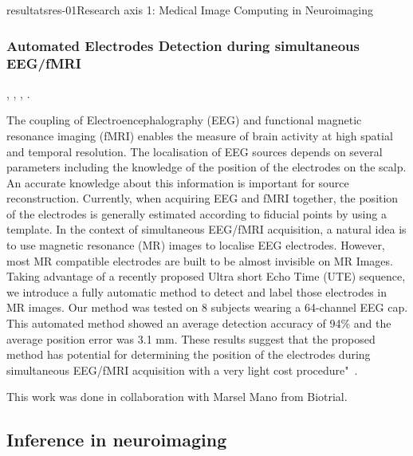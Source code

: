 \documentclass{ra2018}
\begin{document}
\begin{module}{resultats}{res-01}{Research axis 1: Medical Image Computing in Neuroimaging}
\subsubsection{Automated Electrodes Detection during simultaneous EEG/fMRI}
\begin{participants}
      ,
      ,
      ,
      .     
\end{participants}
The coupling of Electroencephalography (EEG) and functional magnetic resonance imaging (fMRI) enables the measure of brain activity at high spatial and temporal resolution. The localisation of EEG sources depends on several parameters including the knowledge of the position of the electrodes on the scalp. An accurate knowledge about this information is important for source reconstruction. Currently, when acquiring EEG and fMRI together, the position of the electrodes is generally estimated according to fiducial points by using a template. In the context of simultaneous EEG/fMRI acquisition, a natural idea is to use magnetic resonance (MR) images to localise EEG electrodes. However, most MR compatible electrodes are built to be almost invisible on MR Images. Taking advantage of a recently proposed Ultra short Echo Time (UTE) sequence, we introduce a fully automatic method to detect and label those electrodes in MR images. Our method was tested on 8 subjects wearing a 64-channel EEG cap. This automated method showed an average detection accuracy of 94\% and the average position error was 3.1 mm. These results suggest that the proposed method has potential for determining the position of the electrodes during simultaneous EEG/fMRI acquisition with a very light cost procedure"~\cite{fleury:hal-01939735, fleury:hal-01874815}.

This work was done in collaboration with Marsel Mano from Biotrial.

\subsection{Inference in neuroimaging}

\end{module}
\end{document}
